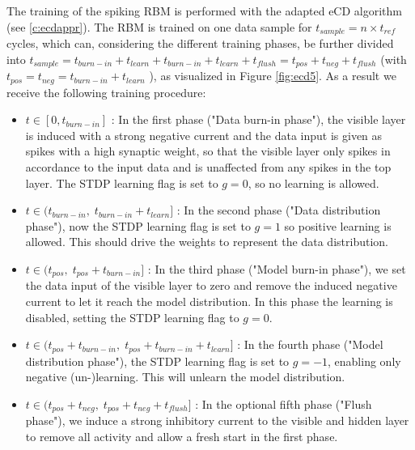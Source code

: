 The training of the spiking RBM is performed with the adapted eCD algorithm (see \ref{c:ecdappr}).
The RBM is trained on one data sample for $t_{sample} = n \times t_{ref}$ cycles, which can, considering the different training phases, be further divided into $t_{sample} = t_{burn-in} + t_{learn} + t_{burn-in} + t_{learn} + t_{flush} = t_{pos} + t_{neg} + t_{flush}$ (with $t_{pos} = t_{neg} = t_{burn-in} + t_{learn}$ ), as visualized in Figure \ref{fig:ecd5}. 
As a result we receive the following training procedure:
\begin{itemize}

\item $t \in [0, t_{burn-in}]$ : In the first phase ("Data burn-in phase"), the visible layer is induced with a strong negative current and the data input is given as spikes with a high synaptic weight, so that the visible layer only spikes in accordance to the input data and is unaffected from any spikes in the top layer.
The STDP learning flag is set to $g=0$, so no learning is allowed.

\item $t \in (t_{burn-in} , \; t_{burn-in} + t_{learn}]$ : In the second phase ("Data distribution phase"), now the STDP learning flag is set to $g=1$ so positive learning is allowed.
This should drive the weights to represent the data distribution.

\item $t \in (t_{pos}, \;  t_{pos} + t_{burn-in}]$ : In the third phase ("Model burn-in phase"), we set the data input of the visible layer to zero and remove the induced negative current to let it reach the model distribution.
In this phase the learning is disabled, setting the STDP learning flag to $g=0$.

\item $t \in (t_{pos} + t_{burn-in}, \;  t_{pos} + t_{burn-in} + t_{learn}]$ : In the fourth phase ("Model distribution phase"), the STDP learning flag is set to $g=-1$, enabling only negative (un-)learning.
This will unlearn the model distribution.

\item $t \in (t_{pos} + t_{neg}, \;  t_{pos} + t_{neg} + t_{flush}]$ : In the optional fifth phase ("Flush phase"), we induce a strong inhibitory current to the visible and hidden layer to remove all activity and allow a fresh start in the first phase.

\end{itemize}


